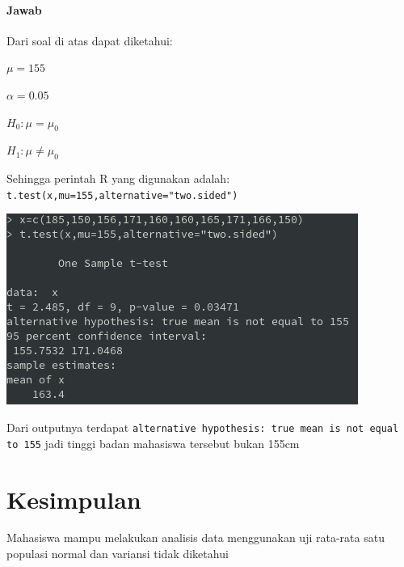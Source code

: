 \documentclass[a4paper,12pt]{article}
\begin{document}
\paragraph{Jawab\\}
Dari soal di atas dapat diketahui:
\begin{center}
    \item $\mu = 155$
    \item $\alpha = 0.05$
    \item $H_{0} : \mu = \mu_{0}$
    \item $H_{1} : \mu \neq \mu_{0}$
\end{center}
Sehingga perintah R yang digunakan adalah:\\
\texttt{t.test(x,mu=155,alternative="two.sided")}\\
\begin{center}
    \includegraphics[width=0.8\linewidth]{tugas2.png}
\end{center}
Dari outputnya terdapat \texttt{alternative hypothesis: true mean is not equal to 155} jadi tinggi badan mahasiswa tersebut bukan 155cm

\newpage

\section{Kesimpulan}
Mahasiswa mampu melakukan analisis data menggunakan uji rata-rata satu populasi normal dan variansi tidak diketahui
\end{document}
